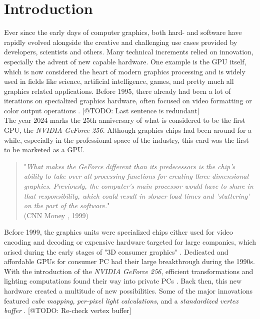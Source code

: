 \chapter{Introduction} \label{cpt-introduction}

Ever since the early days of computer graphics, both hard- and software have rapidly evolved
alongside the creative and challenging use cases provided by developers, scientists and others.
Many technical increments relied on innovation, especially the advent of new capable hardware.
One example is the \ac{GPU} itself, which is now considered the heart of modern graphics 
processing and is widely used in fields like science, artificial intelligence, games, and pretty 
much all graphics related applications. Before 1995, there already had been a lot of iterations 
on specialized graphics hardware, often focused on video formatting or color output operations
\cite{Singer2023}. [@TODO: Last sentence is redundant]\\

\noindent
The year 2024 marks the 25th anniversary of what is considered to be the first \ac{GPU}, the 
\emph{NVIDIA GeForce 256}. Although graphics chips had been around for a while, especially 
in the professional space of the industry, this card was the first to be marketed as a \ac{GPU}. 

\begin{quote}
    "\emph{What makes the GeForce different than its predecessors is the chip's ability to take over all 
    processing functions for creating three-dimensional graphics. Previously, the computer's main 
    processor would have to share in that responsibility, which could result in slower load times 
    and 'stuttering' on the part of the software.}" \\  
    (CNN Money \cite{CNNMoney1999}, 1999)
\end{quote}

\noindent
Before 1999, the graphics units were specialized chips either used for video encoding and decoding
or expensive hardware targeted for large companies, which arised during the early stages of "3D 
consumer graphics" \cite{Singer2023}. Dedicated and affordable \ac{GPU}s for consumer \ac{PC} had 
their large breakthrough during the 1990s. With the introduction of the \emph{NVIDIA GeForce 256}, 
efficient transformations and lighting computations found their way into private \ac{PC}s 
\cite{Fenno2024}. Back then, this new hardware created a multitude of new possibilities. Some of the 
major innovations featured \emph{cube mapping}, \emph{per-pixel light calculations}, and a 
\emph{standardized vertex buffer} \cite{NVIDIA1999, Battaglia2024}. [@TODO: Re-check vertex buffer] \\

